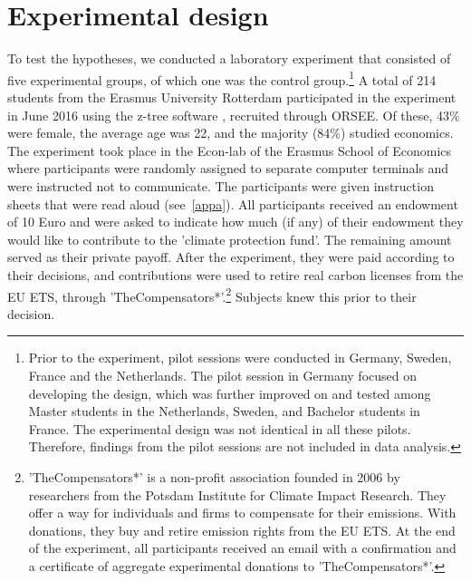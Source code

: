 \documentclass[review, authoryear,12pt]{elsarticle}
\begin{document}
\section{Experimental design}
To test the hypotheses, we conducted a laboratory experiment that consisted of five experimental groups, of which one was the control group.\footnote{Prior to the experiment, pilot sessions were conducted in Germany, Sweden, France and the Netherlands. The pilot session in Germany focused on developing the design, which was further improved on and tested among Master students in the Netherlands, Sweden, and Bachelor students in France. The experimental design was not identical in all these pilots. Therefore, findings from the pilot sessions are not included in data analysis.} A total of 214 students from the Erasmus University Rotterdam participated in the experiment in June 2016 using the z-tree software \citep{Fischbacher.2007}, recruited through ORSEE. Of these, 43\% were female, the average age was 22, and the majority (84\%) studied economics. The experiment took place in the Econ-lab of the Erasmus School of Economics where participants were randomly assigned to separate computer terminals and were instructed not to communicate. The participants were given instruction sheets that were read aloud (see~\ref{appa}). All participants received an endowment of 10 Euro and were asked to indicate how much (if any) of their endowment they would like to contribute to the 'climate protection fund'. The remaining amount served as their private payoff. After the experiment, they were paid according to their decisions, and contributions were used to retire real carbon licenses from the EU ETS, through 'TheCompensators*'.\footnote{'TheCompensators*' is a non-profit association founded in 2006 by researchers from the Potsdam Institute for Climate Impact Research. They offer a way for individuals and firms to compensate for their emissions. With donations, they buy and retire emission rights from the EU ETS. At the end of the experiment, all participants received an email with a confirmation and a certificate of aggregate experimental donations to 'TheCompensators*'.} Subjects knew this prior to their decision.
\end{document}
